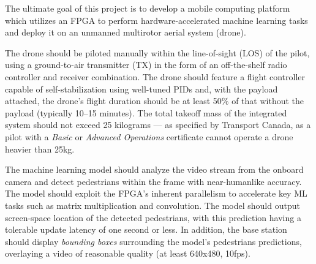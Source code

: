 The ultimate goal of this project is to develop a mobile computing platform which utilizes an FPGA to perform hardware-accelerated machine learning tasks and deploy it on an unmanned multirotor aerial system (drone). 

The drone should be piloted manually within the line-of-sight (LOS) of the pilot, using a ground-to-air transmitter (TX) in the form of an off-the-shelf radio controller and receiver combination. The drone should feature a flight controller capable of self-stabilization using well-tuned PIDs and,
with the payload attached, the drone's flight duration should be at least 50\% of that without the payload (typically 10--15 minutes).
The total takeoff mass of the integrated system should not exceed 25 kilograms --- as specified by Transport Canada, as a pilot with a \textit{Basic} or \textit{Advanced Operations} certificate cannot operate a drone heavier than 25kg.

The machine learning model should analyze the video stream from the onboard camera and detect pedestrians within the frame with near-humanlike accuracy. The model should exploit the FPGA's inherent parallelism to accelerate key ML tasks such as matrix multiplication and convolution. The model should output screen-space location of the detected pedestrians, with this prediction having a tolerable update latency of one second or less. In addition, the base station should display \textit{bounding boxes} surrounding the model's pedestrians predictions, overlaying a video of reasonable quality (at least 640x480, 10fps).
